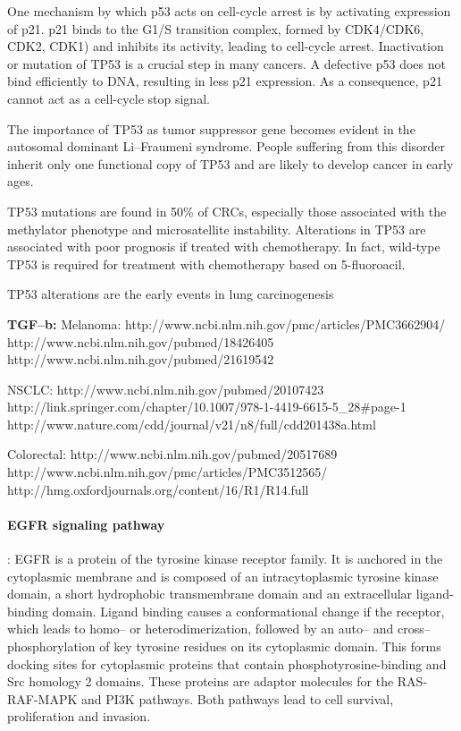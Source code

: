       One mechanism by which p53 acts on cell-cycle arrest is by activating
      expression of p21. p21 binds to the G1/S transition complex, formed by
      CDK4/CDK6, CDK2, CDK1) and inhibits its activity, leading to cell-cycle
      arrest. Inactivation or mutation of TP53 is a crucial step in many
      cancers. A defective p53 does not bind efficiently to DNA, resulting in
      less p21 expression. As a consequence, p21 cannot act as a cell-cycle stop
      signal.

      The importance of TP53 as tumor suppressor gene becomes evident in the
      autosomal dominant Li--Fraumeni syndrome. People suffering from this disorder inherit only
      one functional copy of TP53 and are likely to develop cancer in early
      ages.

      TP53 mutations are found in 50\% of CRCs,
      especially those associated with the methylator phenotype and
      microsatellite instability. Alterations in TP53 are associated with poor
      prognosis if treated with chemotherapy. In fact, wild-type TP53 is
      required for treatment with chemotherapy based on 5-fluoroacil.

      TP53 alterations are the early events in lung carcinogenesis


      \textbf{TGF--b:}
      Melanoma: http://www.ncbi.nlm.nih.gov/pmc/articles/PMC3662904/
      http://www.ncbi.nlm.nih.gov/pubmed/18426405
      http://www.ncbi.nlm.nih.gov/pubmed/21619542

      NSCLC: http://www.ncbi.nlm.nih.gov/pubmed/20107423
      http://link.springer.com/chapter/10.1007/978-1-4419-6615-5_28#page-1
      http://www.nature.com/cdd/journal/v21/n8/full/cdd201438a.html

      Colorectal: http://www.ncbi.nlm.nih.gov/pubmed/20517689
      http://www.ncbi.nlm.nih.gov/pmc/articles/PMC3512565/
      http://hmg.oxfordjournals.org/content/16/R1/R14.full

      \paragraph{EGFR signaling pathway}: EGFR is a protein of the tyrosine kinase
      receptor family. It is anchored in the cytoplasmic membrane and is
      composed of an intracytoplasmic tyrosine kinase domain, a short
      hydrophobic transmembrane domain and an extracellular ligand-binding
      domain. Ligand binding causes a conformational change if the receptor,
      which leads to homo-- or heterodimerization, followed by an auto-- and
      cross--phosphorylation of key tyrosine residues on its cytoplasmic domain.
      This forms docking sites for cytoplasmic proteins that contain
      phosphotyrosine-binding and Src homology 2 domains. These proteins are
      adaptor molecules for the RAS-RAF-MAPK and PI3K pathways. Both pathways
      lead to cell survival, proliferation and invasion.

